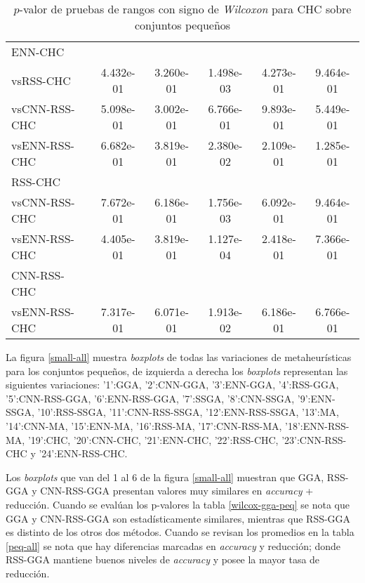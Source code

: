 \begin{table}[h!]
\begin{adjustbox}{max width =\textwidth}
\begin{tabular}{l c c c c c}
\hline

ENN-CHC\\
vsRSS-CHC & 4.432e-01 & 3.260e-01 & 1.498e-03 & 4.273e-01 & 9.464e-01 \\ 
vsCNN-RSS-CHC & 5.098e-01 & 3.002e-01 & 6.766e-01 & 9.893e-01 & 5.449e-01 \\ 
vsENN-RSS-CHC & 6.682e-01 & 3.819e-01 & 2.380e-02 & 2.109e-01 & 1.285e-01 \\ 

\hline

RSS-CHC\\
vsCNN-RSS-CHC & 7.672e-01 & 6.186e-01 & 1.756e-03 & 6.092e-01 & 9.464e-01 \\ 
vsENN-RSS-CHC & 4.405e-01 & 3.819e-01 & 1.127e-04 & 2.418e-01 & 7.366e-01 \\ 

\hline

CNN-RSS-CHC\\
vsENN-RSS-CHC & 7.317e-01 & 6.071e-01 & 1.913e-02 & 6.186e-01 & 6.766e-01 \\ 

\hline 

\end{tabular}
\end{adjustbox}
\caption[Pruebas de \emph{Wilcoxon} entre CHC y variaciones para conjuntos pequeños]{$p$-valor de pruebas de rangos con signo de \emph{Wilcoxon} para CHC sobre conjuntos pequeños}
\label{wilcox-CHC-peq}
\end{table}

La figura \ref{small-all} muestra \emph{boxplots} de todas las variaciones de metaheurísticas para los conjuntos pequeños, de izquierda a derecha los \emph{boxplots} representan las siguientes variaciones: '1':GGA, '2':CNN-GGA, '3':ENN-GGA, '4':RSS-GGA, '5':CNN-RSS-GGA, '6':ENN-RSS-GGA, '7':SSGA, '8':CNN-SSGA, '9':ENN-SSGA, '10':RSS-SSGA, '11':CNN-RSS-SSGA, '12':ENN-RSS-SSGA, '13':MA, '14':CNN-MA, '15':ENN-MA, '16':RSS-MA, '17':CNN-RSS-MA, '18':ENN-RSS-MA, '19':CHC, '20':CNN-CHC, '21':ENN-CHC, '22':RSS-CHC, '23':CNN-RSS-CHC y '24':ENN-RSS-CHC.

Los \emph{boxplots} que van del 1 al 6 de la figura \ref{small-all} muestran que GGA, RSS-GGA y CNN-RSS-GGA presentan valores muy similares en \emph{accuracy} + reducción. Cuando se evalúan los p-valores la tabla \ref{wilcox-gga-peq} se nota que GGA y CNN-RSS-GGA son estadísticamente similares, mientras que RSS-GGA es distinto de los otros dos métodos. Cuando se revisan los promedios en la tabla \ref{peq-all} se nota que hay diferencias marcadas en \emph{accuracy} y reducción; donde RSS-GGA mantiene buenos niveles de \emph{accuracy} y posee la mayor tasa de reducción. 

